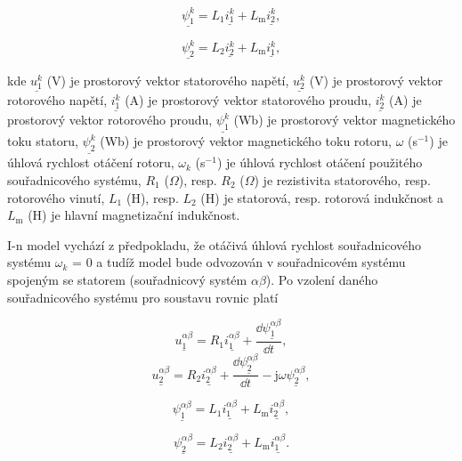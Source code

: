 \documentclass[a4paper, twoside, 11pt]{article}
\begin{document}
		\begin{equation}
			\underline{\psi_1^{k}} = L_1 \underline{i_1^{k}} + L_\text{m} \underline{i_2^{k}},
		\end{equation}
	
		\begin{equation}
			\underline{\psi_2^{k}} = L_2 \underline{i_2^{k}} + L_\text{m} \underline{i_1^{k}},
		\end{equation}

		kde $\underline{u_{1}^{k}}$ (V) je prostorový vektor statorového napětí, $\underline{u_{2}^{k}}$ (V) je prostorový vektor rotorového napětí, $\underline{i_{1}^{k}}$ (A) je prostorový vektor statorového proudu, $\underline{i_{2}^{k}}$ (A) je prostorový vektor rotorového proudu, $\underline{\psi_1^{k}}$ (Wb) je prostorový vektor magnetického toku statoru, $\underline{\psi_2^{k}}$ (Wb) je prostorový vektor magnetického toku rotoru, $\omega$ (s$^{-1}$) je úhlová rychlost otáčení rotoru, $\omega_k$ (s$^{-1}$) je úhlová rychlost otáčení použitého souřadnicového systému, $R_1$ ($\Omega$), resp. $R_2$ ($\Omega$) je rezistivita statorového, resp. rotorového vinutí, $L_1$ (H), resp. $L_2$ (H) je statorová, resp. rotorová indukčnost a $L_\text{m}$ (H) je hlavní magnetizační indukčnost.\par
		I-n model vychází z předpokladu, že otáčivá úhlová rychlost souřadnicového systému $\omega_k$ = 0 a tudíž model bude odvozován v souřadnicovém systému spojeným se statorem (souřadnicový systém $\alpha \beta$). Po vzolení daného souřadnicového systému pro soustavu rovnic platí

		\begin{equation}
			\underline{u_{1}^{\alpha \beta}} = R_1 \underline{i_{1}^{\alpha \beta}} + \frac{\dd{\underline{\psi_1^{\alpha \beta}}}}{\dd{t}},
		\end{equation}
		\begin{equation}\label{eq:alphabeta-napeti-rotor-rovnice-i-n-model}
			\underline{u_{2}^{\alpha \beta}} = R_2 \underline{i_{2}^{\alpha \beta}} + \frac{\dd{\underline{\psi_2^{\alpha \beta}}}}{\dd{t}} - \text{j} \omega \underline{\psi_2^{\alpha \beta}},
		\end{equation}
	
		\begin{equation}
			\underline{\psi_1^{\alpha \beta}} = L_1 \underline{i_1^{\alpha \beta}} + L_\text{m} \underline{i_2^{\alpha \beta}},
		\end{equation}
	
		\begin{equation}\label{eq:alphabeta-tok-rotor-rovnice-i-n-model}
			\underline{\psi_2^{\alpha \beta}} = L_2 \underline{i_2^{\alpha \beta}} + L_\text{m} \underline{i_1^{\alpha \beta}}.
		\end{equation}
\end{document}
